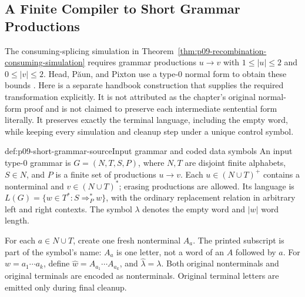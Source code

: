 \subsection{A Finite Compiler to Short Grammar Productions}
\label{sec:p09-short-grammar-normalization}

The consuming-splicing simulation in
Theorem~\ref{thm:p09-recombination-consuming-simulation} requires grammar
productions \(u\to v\) with \(1\leq|u|\leq2\) and \(0\leq|v|\leq2\).
Head, P\u{a}un, and Pixton use a type-0 normal form to obtain these bounds
\cite[Theorem~3.6, p.~320]{HeadPaunPixton1997RecombinationIntake}.
Here is a separate handbook construction that supplies the required
transformation explicitly. It is not attributed as the chapter's original
normal-form proof and is not claimed to preserve each intermediate
sentential form literally. It preserves exactly the terminal language,
including the empty word, while keeping every simulation and cleanup step
under a unique control symbol.

\begin{hbdefinition}{def:p09-short-grammar-source}{Input grammar and coded data symbols}
An input type-0 grammar is \(G=(N,T,S,P)\), where \(N,T\) are disjoint
finite alphabets, \(S\in N\), and \(P\) is a finite set of productions
\(u\to v\). Each \(u\in(N\cup T)^+\) contains a nonterminal and
\(v\in(N\cup T)^*\); erasing productions are allowed.
Its language is
\(L(G)=\{w\in T^*:S\Longrightarrow_P^*w\}\), with the ordinary
replacement relation in arbitrary left and right contexts.
The symbol \(\lambda\) denotes the empty word and \(|w|\) word length.

For each \(a\in N\cup T\), create one fresh nonterminal \(A_a\).
The printed subscript is part of the symbol's name: \(A_a\) is one
letter, not a word of an \(A\) followed by \(a\).
For \(w=a_1\cdots a_k\), define
\(\widehat w=A_{a_1}\cdots A_{a_k}\), and
\(\widehat\lambda=\lambda\). Both original nonterminals and original
terminals are encoded as nonterminals. Original terminal letters are
emitted only during final cleanup.
\end{hbdefinition}

